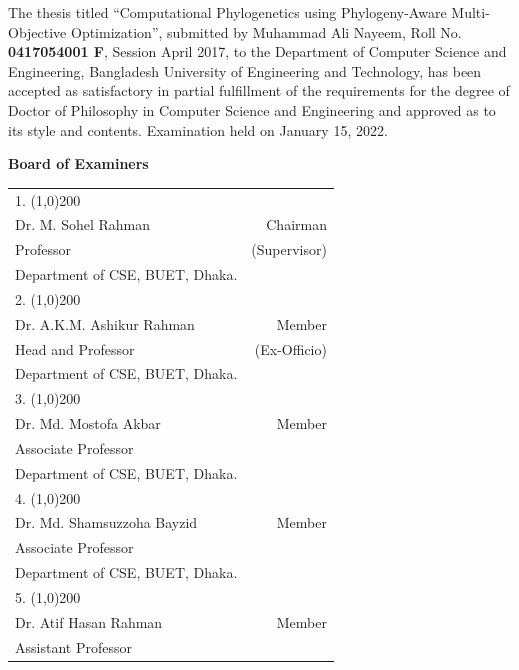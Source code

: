 \begin{singlespace}
\small{
 The thesis titled ``Computational Phylogenetics using Phylogeny-Aware Multi-Objective Optimization'', submitted by Muhammad Ali Nayeem, Roll No.
 \textbf{0417054001 F}, Session April 2017, to the Department of Computer Science
 and Engineering, Bangladesh University of Engineering and Technology, has been accepted as satisfactory 
 in partial fulfillment of the requirements for the degree of Doctor of Philosophy in Computer Science and Engineering and approved as to its style and contents. Examination held on January 15, 2022. \\ 
 
 \begin{spacing}{0.5}	
 \begin{center}
 	\textbf{\Large Board of Examiners}
 \end{center}
 \begin{tabular}{p{12cm} r }
 	\vspace{0.1cm}
 	1. \line(1,0){200} &  \\
 	Dr. M. Sohel Rahman & Chairman\\ 
 	Professor & (Supervisor)\\
 	Department of CSE, BUET, Dhaka.  & \\
 	\vspace{0.1cm}
 	2. \line(1,0){200} &  \\
 	Dr. A.K.M. Ashikur Rahman & Member\\ 
 	Head and Professor & (Ex-Officio)\\
  	Department of CSE, BUET, Dhaka.  & \\
 	\vspace{0.1cm}
 	3. \line(1,0){200} &  \\
 	Dr. Md. Mostofa Akbar & Member\\ 
 	Associate Professor & \\
 	Department of CSE, BUET, Dhaka.  & \\
 	\vspace{0.1cm}
 	4. \line(1,0){200} &  \\
 	Dr. Md. Shamsuzzoha Bayzid  & Member\\ 
 	Associate Professor & \\
 	Department of CSE, BUET, Dhaka.  & \\
 	\vspace{0.1cm}
 	5. \line(1,0){200} &  \\
 	Dr. Atif Hasan Rahman  & Member\\ 
 	Assistant Professor & \\

\end{tabular}
\end{spacing}}
\end{singlespace}
